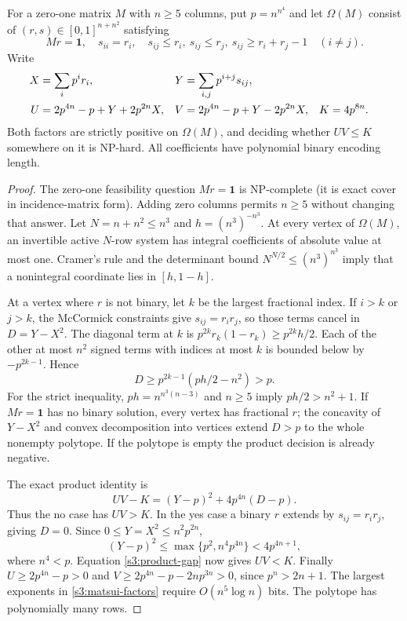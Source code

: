 \begin{lemma}\label{s3:matsui}
For a zero-one matrix $M$ with $n\ge5$ columns, put $p=n^{n^4}$ and let
$\Omega(M)$ consist of $(r,s)\in[0,1]^{n+n^2}$ satisfying
\[
 Mr=\mathbf1,\quad s_{ii}=r_i,\quad
 s_{ij}\le r_i,\ s_{ij}\le r_j,\ s_{ij}\ge r_i+r_j-1\quad(i\ne j).
\]
Write
\begin{align}
 X&=\sum_i p^i r_i,&Y&=\sum_{i,j}p^{i+j}s_{ij},\notag\\
 U&=2p^{4n}-p+Y+2p^{2n}X,&
 V&=2p^{4n}-p+Y-2p^{2n}X,&K&=4p^{8n}.
 \label{s3:matsui-factors}
\end{align}
Both factors are strictly positive on $\Omega(M)$, and deciding whether
$UV\le K$ somewhere on it is NP-hard. All coefficients have polynomial
binary encoding length.
\end{lemma}
\begin{proof}
The zero-one feasibility question $Mr=\mathbf1$ is NP-complete (it is
exact cover in incidence-matrix form). Adding zero columns permits
$n\ge5$ without changing that answer. Let $N=n+n^2\le n^3$ and
$h=(n^3)^{-n^3}$. At every vertex of $\Omega(M)$, an invertible active
$N$-row system has integral coefficients of absolute value at most one.
Cramer's rule and the determinant bound $N^{N/2}\le(n^3)^{n^3}$ imply
that a nonintegral coordinate lies in $[h,1-h]$.

At a vertex where $r$ is not binary, let $k$ be the largest fractional
index. If $i>k$ or $j>k$, the McCormick constraints give
$s_{ij}=r_ir_j$, so those terms cancel in $D=Y-X^2$. The diagonal
term at $k$ is $p^{2k}r_k(1-r_k)\ge p^{2k}h/2$. Each of the other
at most $n^2$ signed terms with indices at most $k$ is bounded below
by $-p^{2k-1}$. Hence
\begin{equation}
 D\ge p^{2k-1}(ph/2-n^2)>p.\label{s3:corrected-matsui-gap}
\end{equation}
For the strict inequality, $ph=n^{n^3(n-3)}$ and $n\ge5$ imply
$ph/2>n^2+1$. If $Mr=\mathbf1$ has no binary solution, every vertex
has fractional $r$; the concavity of $Y-X^2$ and convex decomposition
into vertices extend $D>p$ to the whole nonempty polytope. If the
polytope is empty the product decision is already negative.

The exact product identity is
\begin{equation}
 UV-K=(Y-p)^2+4p^{4n}(D-p).\label{s3:product-gap}
\end{equation}
Thus the no case has $UV>K$. In the yes case a binary $r$ extends by
$s_{ij}=r_ir_j$, giving $D=0$. Since $0\le Y=X^2\le n^2p^{2n}$,
\[
 (Y-p)^2\le\max\{p^2,n^4p^{4n}\}<4p^{4n+1},
\]
where $n^4<p$. Equation \eqref{s3:product-gap} now gives $UV<K$.
Finally $U\ge2p^{4n}-p>0$ and
$V\ge2p^{4n}-p-2np^{3n}>0$, since $p^n>2n+1$.
The largest exponents in \eqref{s3:matsui-factors} require
$O(n^5\log n)$ bits. The polytope has polynomially many rows.
\end{proof}

